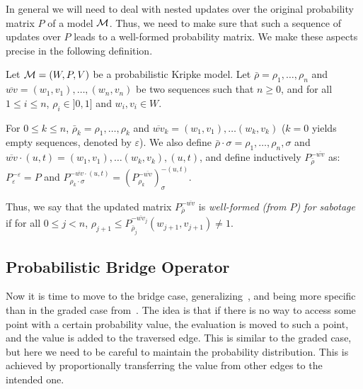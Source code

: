 In general we will need to deal with nested updates over the original probability matrix $P$ of a model $\mathcal{M}$. Thus, we need to make sure that such a sequence of updates over $P$ leads to a well-formed probability matrix. We make these aspects precise in the following definition.

\begin{definition}
    \label{def:sab-well-found}
    Let $\mathcal{M}=(W,P,V)$ be a probabilistic Kripke model. Let $\bar{\rho}=\rho_1,\dots,\rho_n$ and ${\overline{wv}}=(w_1,v_1),\ldots,(w_n,v_n)$ be two sequences such that $n\geq 0$, and for all $1\leq i \leq n$, $\rho_i\in]0,1]$ and $w_i,v_i\in W$. 
    
    For $0\leq k \leq n$,  $\bar{\rho}_k=\rho_1,\dots,\rho_k$ and ${\overline{wv}}_k=(w_1,v_1),\ldots(w_k,v_k)$ ($k=0$ yields empty sequences, denoted by $\varepsilon$). 
    We also define $\bar{\rho}\cdot \sigma=\rho_1,\dots,\rho_n,\sigma$ and ${\overline{wv}}\cdot(u,t)=(w_1,v_1),\ldots(w_k,v_k),(u,t)$, and define inductively $P^{-\overline{wv}}_{\bar{\rho}}$ as:
    $P_{\varepsilon}^{-\varepsilon}=P$ and $P_{\rho_k\cdot\sigma}^{-\overline{wv}\cdot (u,t)}= (P_{\rho_k}^{-\overline{wv}})^{-(u,t)}_\sigma$.

    Thus, we say that the updated matrix $P^{-\overline{wv}}_{\bar{\rho}}$ is \emph{well-formed (from $P$) for sabotage} if for all $0\leq j < n$, $\rho_{j+1} \leq P^{-{\overline{wv}}_j}_{\bar{\rho}_j}(w_{j+1},v_{j+1})\neq 1$. 
\end{definition}

\subsection{Probabilistic Bridge Operator}

Now it is time to move to the bridge case, generalizing~\cite{Fervari14,ArecesFH15}, and being more specific than in the graded case from~\cite{FFM25}. The idea is that if there is no way to access some point with a certain probability value, the evaluation is moved to such a point, and the value is added to the traversed edge. This is similar to the graded case, but here we need to be careful to maintain the probability distribution. This is achieved by proportionally transferring the value from other edges to the intended one.

